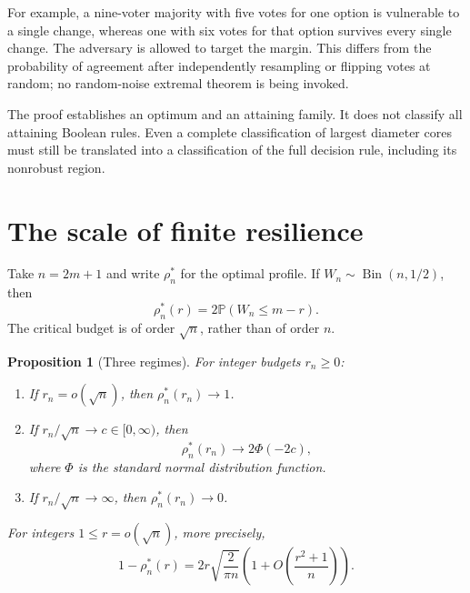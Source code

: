 \documentclass[11pt]{article}
\newtheorem{proposition}[theorem]{Proposition}
\theoremstyle{definition}
\theoremstyle{remark}
\newcommand{\Prb}{\mathbb P}
\begin{document}
For example, a nine-voter majority with five votes for one option is vulnerable
to a single change, whereas one with six votes for that option survives every
single change. The adversary is allowed to target the margin. This differs from
the probability of agreement after independently resampling or flipping votes
at random; no random-noise extremal theorem is being invoked.

The proof establishes an optimum and an attaining family. It does not classify
all attaining Boolean rules. Even a complete classification of largest diameter
cores must still be translated into a classification of the full decision rule,
including its nonrobust region.

\section{The scale of finite resilience}
\label{rch:sec:scales}

Take \(n=2m+1\) and write \(\rho_n^*\) for the optimal profile. If
\(W_n\sim\operatorname{Bin}(n,1/2)\), then
\begin{equation}
 \rho_n^*(r)=2\Prb(W_n\le m-r).
 \label{rch:eq:binomial}
\end{equation}
The critical budget is of order \(\sqrt n\), rather than of order \(n\).

\begin{proposition}[Three regimes]
\label{rch:prop:scales}
For integer budgets \(r_n\ge0\):
\begin{enumerate}[label=(\roman*)]
\item If \(r_n=o(\sqrt n)\), then \(\rho_n^*(r_n)\to1\).
\item If \(r_n/\sqrt n\to c\in[0,\infty)\), then
\begin{equation}
 \rho_n^*(r_n)\longrightarrow2\Phi(-2c),
 \label{rch:eq:normalprofile}
\end{equation}
where \(\Phi\) is the standard normal distribution function.
\item If \(r_n/\sqrt n\to\infty\), then \(\rho_n^*(r_n)\to0\).
\end{enumerate}
For integers \(1\le r=o(\sqrt n)\), more precisely,
\begin{equation}
 1-\rho_n^*(r)
 =2r\sqrt{\frac{2}{\pi n}}
   \left(1+O\!\left(\frac{r^2+1}{n}\right)\right).
 \label{rch:eq:smallbudget}
\end{equation}
\end{proposition}
\end{document}
